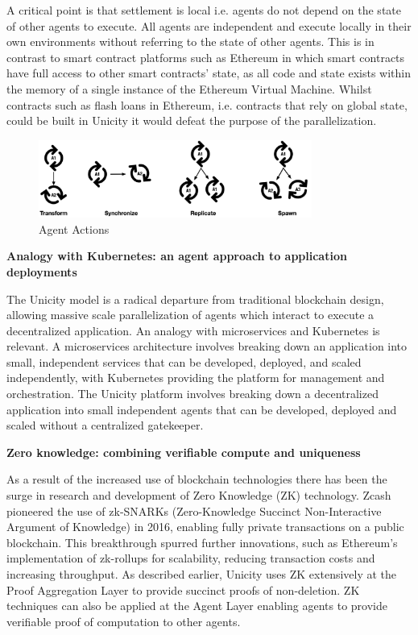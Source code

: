 \documentclass{article}
\begin{document}
\vspace{2mm}

A critical point is that settlement is local i.e. agents do not depend on the state of other agents to execute. All agents are independent and execute locally in their own environments without referring to the state of other agents. This is in contrast to smart contract platforms such as Ethereum in which smart contracts have full access to other smart contracts' state, as all code and state exists within the memory of a single instance of the Ethereum Virtual Machine. Whilst contracts such as flash loans in Ethereum, i.e. contracts that rely on global state, could be built in Unicity it would defeat the purpose of the parallelization.


\begin{figure}[H]
    \centering
    \includegraphics[width=0.8\textwidth]{Replication.png}
    \caption{Agent Actions}
    \label{fig:AgentSpawn}
\end{figure}



\vspace{2mm}
\textbf{Analogy with Kubernetes: an agent approach to application deployments}
\vspace{2mm}

The Unicity model is a radical departure from traditional blockchain design, allowing massive scale parallelization of agents which interact to execute a decentralized application. An analogy with microservices and Kubernetes is relevant. A microservices architecture involves breaking down an application into small, independent services that can be developed, deployed, and scaled independently, with Kubernetes providing the platform for management and orchestration. The Unicity platform involves breaking down a decentralized application into small independent agents that can be developed, deployed and scaled without a centralized gatekeeper. 


\vspace{2mm}
\textbf{Zero knowledge: combining verifiable compute and  uniqueness}
\vspace{2mm}

As a result of the increased use of blockchain technologies there has been the surge in research and development of Zero Knowledge (ZK) technology. Zcash pioneered the use of zk-SNARKs (Zero-Knowledge Succinct Non-Interactive Argument of Knowledge) in 2016, enabling fully private transactions on a public blockchain. This breakthrough spurred further innovations, such as Ethereum's implementation of zk-rollups for scalability, reducing transaction costs and increasing throughput. As described earlier, Unicity uses ZK extensively at the Proof Aggregation Layer to provide succinct proofs of non-deletion. ZK techniques can also be applied at the Agent Layer enabling agents to provide verifiable proof of computation to other agents.
\end{document}
